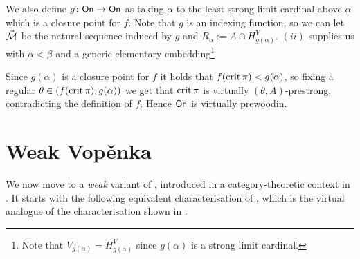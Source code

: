 \documentclass[../main]{subfiles}
\begin{document}
{  \qquad We also define $g\colon\textsf{On}\to\textsf{On}$ as taking $\alpha$ to the least strong limit cardinal above $\alpha$ which is a closure point for $f$. Note that $g$ is an indexing function, so we can let $\vec{\operatorname{\mathcal M}}$ be the natural sequence induced by $g$ and $R_\alpha := A\cap H_{g(\alpha)}^V$. $(ii)$ supplies us with $\alpha<\beta$ and a generic elementary embedding\footnote{Note that $V_{g(\alpha)}=H_{g(\alpha)}^V$ since $g(\alpha)$ is a strong limit cardinal.}

  Since $g(\alpha)$ is a closure point for $f$ it holds that $f(\operatorname{crit}\pi)<g(\alpha)$, so fixing a regular $\theta\in(f(\operatorname{crit}\pi), g(\alpha))$ we get that $\operatorname{crit}\pi$ is virtually $(\theta, A)$-prestrong, contradicting the definition of $f$. Hence $\textsf{On}$ is virtually prewoodin.
}


\pagebreak
\section{Weak Vop\v enka}
\label{sect.weakvop}

We now move to a \textit{weak} variant of \gvp, introduced in a category-theoretic context in \cite{AdamekRosicky}. It starts with the following equivalent characterisation of \gvp, which is the virtual analogue of the characterisation shown in \cite{AdamekRosicky}.
\end{document}
